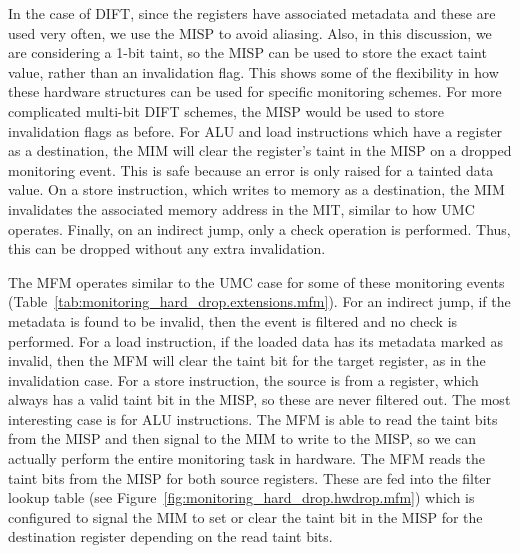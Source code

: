 In the case of DIFT, since the registers have associated metadata and these are
used very often, we use the MISP to avoid aliasing. Also, in this discussion,
we are considering a 1-bit taint, so the MISP can be used to store the exact
taint value, rather than an invalidation flag. This shows some of the
flexibility in how these hardware structures can be used for specific
monitoring schemes. For more complicated multi-bit DIFT schemes, the MISP would
be used to store invalidation flags as before.  For ALU and load instructions
which have a register as a destination, the MIM will clear the register's taint
in the MISP on a dropped monitoring event. This is safe because an error is
only raised for a tainted data value. On a store instruction, which writes to
memory as a destination, the MIM invalidates the associated memory address in
the MIT, similar to how UMC operates. Finally, on an indirect jump, only a
check operation is performed. Thus, this can be dropped without any extra
invalidation. 

The MFM operates similar to the UMC case for some of these monitoring events
(Table~\ref{tab:monitoring_hard_drop.extensions.mfm}).  For an indirect jump,
if the metadata is found to be invalid, then the event is filtered and no check
is performed. For a load instruction, if the loaded data has its metadata
marked as invalid, then the MFM will clear the taint bit for the target
register, as in the invalidation case. For a store instruction, the source is
from a register, which always has a valid taint bit in the MISP, so these are
never filtered out. The most interesting case is for ALU instructions. The MFM
is able to read the taint bits from the MISP and then signal to the MIM to
write to the MISP, so we can actually perform the entire monitoring task in
hardware. The MFM reads the taint bits from the MISP for both source registers.
These are fed into the filter lookup table (see
Figure~\ref{fig:monitoring_hard_drop.hwdrop.mfm}) which is configured to signal
the MIM to set or clear the taint bit in the MISP for the destination register
depending on the read taint bits.

